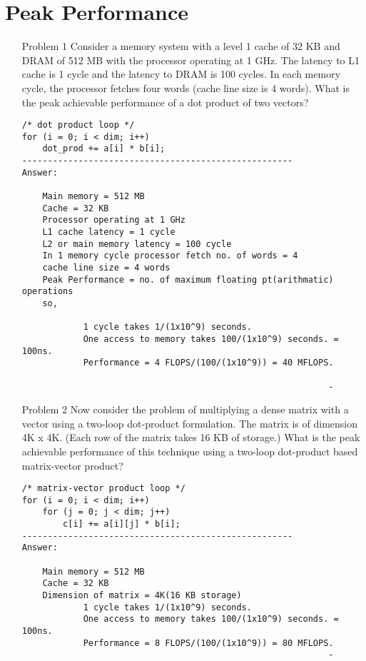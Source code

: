 \documentclass{sem5}
\author{Dilip Puri}
\begin{document}
\section*{Peak Performance}
\begin{enumerate}
\item[Problem 1] Consider a memory system with a level 1 cache of 32 KB and DRAM of 512 MB with the processor operating at 1 GHz. The latency to L1 cache is 1 cycle and the latency to DRAM is 100 cycles. In each memory cycle, the processor fetches four words (cache line size is 4 words). What is the peak achievable performance of a dot product of two vectors?
\lstset{language=C}
\begin{lstlisting}[frame=single]
/* dot product loop */
for (i = 0; i < dim; i++)
	dot_prod += a[i] * b[i];
-----------------------------------------------------
Answer:

	Main memory = 512 MB
	Cache = 32 KB
	Processor operating at 1 GHz
	L1 cache latency = 1 cycle
	L2 or main memory latency = 100 cycle
	In 1 memory cycle processor fetch no. of words = 4
	cache line size = 4 words
	Peak Performance = no. of maximum floating pt(arithmatic) operations
	so,
		
			1 cycle takes 1/(1x10^9) seconds.
			One access to memory takes 100/(1x10^9) seconds. = 100ns.
			Performance = 4 FLOPS/(100/(1x10^9)) = 40 MFLOPS.
			
															-
\end{lstlisting}
\item[Problem 2] Now consider the problem of multiplying a dense matrix with a vector using a two-loop dot-product formulation. The matrix is of dimension 4K x 4K. (Each row of the matrix takes 16 KB of storage.) What is the peak achievable performance of this technique using a two-loop dot-product based matrix-vector product?
\lstset{language=C}
\begin{lstlisting}[frame=single]
/* matrix-vector product loop */
for (i = 0; i < dim; i++)
	for (j = 0; j < dim; j++)
		c[i] += a[i][j] * b[i];
-----------------------------------------------------
Answer:

	Main memory = 512 MB
	Cache = 32 KB
	Dimension of matrix = 4K(16 KB storage)
			1 cycle takes 1/(1x10^9) seconds.
			One access to memory takes 100/(1x10^9) seconds. = 100ns.
			Performance = 8 FLOPS/(100/(1x10^9)) = 80 MFLOPS.
															-
\end{lstlisting}
\end{enumerate}
\end{document}
